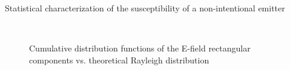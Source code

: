 \documentclass[final,hyperref={pdfpagelabels=false}]{beamer}
\begin{document}
\begin{frame}{}
\begin{columns}[t]
\begin{column}{0.32\linewidth}
\begin{block}{{Statistical characterization of the susceptibility of a non-intentional emitter}}
\begin{figure}
    \\
\vspace{-0.3cm}
    \large{\caption{Cumulative distribution functions of the E-field rectangular components vs. theoretical Rayleigh distribution}}
     \label{fig_diagsr}
\end{figure}
\end{block}

     

    \end{column}%


\end{columns}
\end{frame}
\end{document}
